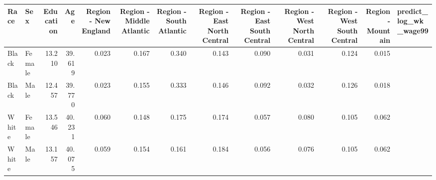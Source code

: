 \begin{tabular}{llrrrrrrrrrrl}
  \hline
Race & Sex & Education & Age & Region - New England & Region - Middle Atlantic & Region - South Atlantic & Region - East North Central & Region - East South Central & Region - West North Central & Region - West South Central & Region - Mountain & predict\_log\_wk\_wage99 \\ 
  \hline
Black & Female & 13.210 & 39.619 & 0.023 & 0.167 & 0.340 & 0.143 & 0.090 & 0.031 & 0.124 & 0.015 &  \\ 
  Black & Male & 12.457 & 39.770 & 0.023 & 0.155 & 0.333 & 0.146 & 0.092 & 0.032 & 0.126 & 0.018 &  \\ 
  White & Female & 13.546 & 40.231 & 0.060 & 0.148 & 0.175 & 0.174 & 0.057 & 0.080 & 0.105 & 0.062 &  \\ 
  White & Male & 13.157 & 40.075 & 0.059 & 0.154 & 0.161 & 0.184 & 0.056 & 0.076 & 0.105 & 0.062 &  \\ 
   \hline
\end{tabular}

